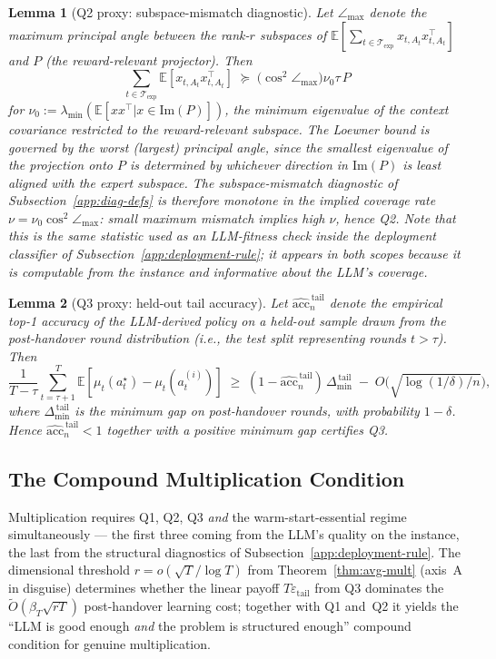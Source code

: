 \documentclass{article}
\newtheorem{lemma}{Lemma}
\theoremstyle{definition}
\theoremstyle{remark}
\theoremstyle{remark}
\begin{document}
\begin{lemma}[Q2 proxy: subspace-mismatch diagnostic]
\label{lem:q2-proxy}
Let $\angle_{\max}$ denote the \emph{maximum} principal angle between
the rank-$r$ subspaces of $\mathbb E[\sum_{t\in\mathcal T_{\mathrm{exp}}}
x_{t,A_t}x_{t,A_t}^\top]$ and $P$ (the reward-relevant projector).
Then
\[
\sum_{t\in\mathcal T_{\mathrm{exp}}}
\mathbb E[x_{t,A_t}x_{t,A_t}^\top]
\;\succeq\; \bigl(\cos^2\angle_{\max}\bigr)\nu_0\tau\,P
\]
for $\nu_0 := \lambda_{\min}(\mathbb E[xx^\top|x\in\mathrm{Im}(P)])$,
the minimum eigenvalue of the context covariance restricted to the
reward-relevant subspace. The Loewner bound is governed by the
\emph{worst} (largest) principal angle, since the smallest eigenvalue
of the projection onto $P$ is determined by whichever direction in
$\mathrm{Im}(P)$ is least aligned with the expert subspace. The
subspace-mismatch diagnostic of
Subsection~\ref{app:diag-defs} is therefore monotone in the implied
coverage rate $\nu = \nu_0\cos^2\angle_{\max}$: small maximum mismatch
implies high $\nu$, hence Q2. Note that this is the same statistic
used as an LLM-fitness check inside the deployment classifier of
Subsection~\ref{app:deployment-rule}; it appears in both scopes
because it is computable from the instance \emph{and} informative
about the LLM's coverage.
\end{lemma}

\begin{lemma}[Q3 proxy: held-out tail accuracy]
\label{lem:q3-proxy}
Let $\widehat{\mathrm{acc}}^{\,\mathrm{tail}}_n$ denote the empirical
top-1 accuracy of the LLM-derived policy on a held-out sample drawn
from the post-handover round distribution (i.e., the test split
representing rounds $t>\tau$). Then
\[
\frac{1}{T-\tau}\sum_{t=\tau+1}^T
\mathbb E[\mu_t(a_t^\star)-\mu_t(a_t^{(i)})]
\;\ge\;
(1-\widehat{\mathrm{acc}}^{\,\mathrm{tail}}_n)\,\Delta_{\min}^{\,\mathrm{tail}}
\;-\; O\!\bigl(\sqrt{\log(1/\delta)/n}\bigr),
\]
where $\Delta_{\min}^{\,\mathrm{tail}}$ is the minimum gap on
post-handover rounds, with probability $1-\delta$. Hence
$\widehat{\mathrm{acc}}^{\,\mathrm{tail}}_n < 1$ together with a
positive minimum gap certifies Q3.
\end{lemma}

\subsection{The Compound Multiplication Condition}
\label{app:compound-condition}

Multiplication requires Q1, Q2, Q3 \emph{and} the warm-start-essential
regime simultaneously --- the first three coming from the LLM's
quality on the instance, the last from the structural diagnostics of
Subsection~\ref{app:deployment-rule}. The dimensional threshold
$r=o(\sqrt T/\log T)$ from Theorem~\ref{thm:avg-mult} (axis~A in
disguise) determines whether the linear payoff
$T\varepsilon_{\mathrm{tail}}$ from Q3 dominates the
$\widetilde O(\beta_T\sqrt{rT})$ post-handover learning cost; together
with Q1 and~Q2 it yields the ``LLM is good enough \emph{and} the
problem is structured enough'' compound condition for genuine
multiplication.
\end{document}
